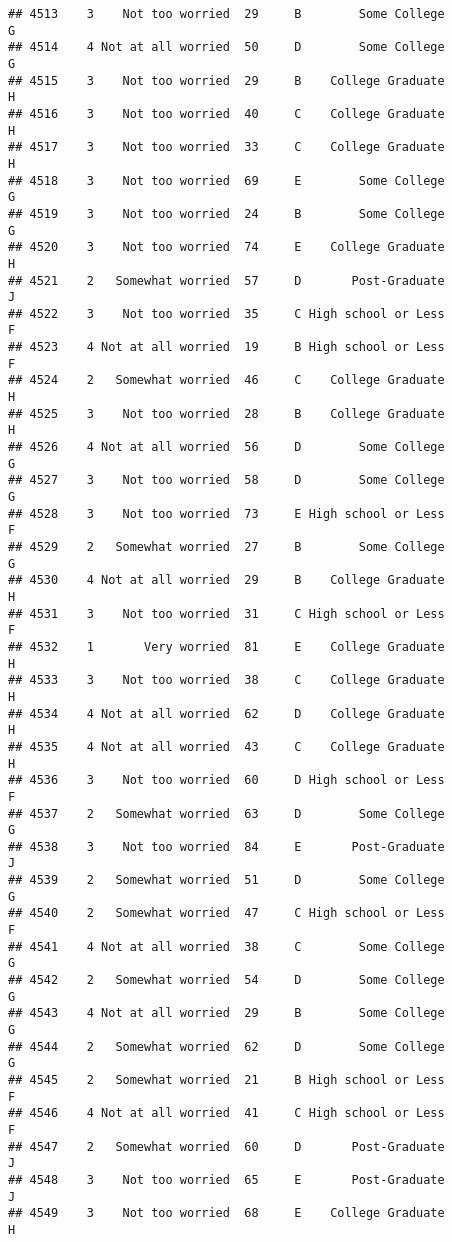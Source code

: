 \documentclass[
]{article}
\begin{document}
\begin{verbatim}
## 4513    3    Not too worried  29     B        Some College         G
## 4514    4 Not at all worried  50     D        Some College         G
## 4515    3    Not too worried  29     B    College Graduate         H
## 4516    3    Not too worried  40     C    College Graduate         H
## 4517    3    Not too worried  33     C    College Graduate         H
## 4518    3    Not too worried  69     E        Some College         G
## 4519    3    Not too worried  24     B        Some College         G
## 4520    3    Not too worried  74     E    College Graduate         H
## 4521    2   Somewhat worried  57     D       Post-Graduate         J
## 4522    3    Not too worried  35     C High school or Less         F
## 4523    4 Not at all worried  19     B High school or Less         F
## 4524    2   Somewhat worried  46     C    College Graduate         H
## 4525    3    Not too worried  28     B    College Graduate         H
## 4526    4 Not at all worried  56     D        Some College         G
## 4527    3    Not too worried  58     D        Some College         G
## 4528    3    Not too worried  73     E High school or Less         F
## 4529    2   Somewhat worried  27     B        Some College         G
## 4530    4 Not at all worried  29     B    College Graduate         H
## 4531    3    Not too worried  31     C High school or Less         F
## 4532    1       Very worried  81     E    College Graduate         H
## 4533    3    Not too worried  38     C    College Graduate         H
## 4534    4 Not at all worried  62     D    College Graduate         H
## 4535    4 Not at all worried  43     C    College Graduate         H
## 4536    3    Not too worried  60     D High school or Less         F
## 4537    2   Somewhat worried  63     D        Some College         G
## 4538    3    Not too worried  84     E       Post-Graduate         J
## 4539    2   Somewhat worried  51     D        Some College         G
## 4540    2   Somewhat worried  47     C High school or Less         F
## 4541    4 Not at all worried  38     C        Some College         G
## 4542    2   Somewhat worried  54     D        Some College         G
## 4543    4 Not at all worried  29     B        Some College         G
## 4544    2   Somewhat worried  62     D        Some College         G
## 4545    2   Somewhat worried  21     B High school or Less         F
## 4546    4 Not at all worried  41     C High school or Less         F
## 4547    2   Somewhat worried  60     D       Post-Graduate         J
## 4548    3    Not too worried  65     E       Post-Graduate         J
## 4549    3    Not too worried  68     E    College Graduate         H

\end{verbatim}
\end{document}
